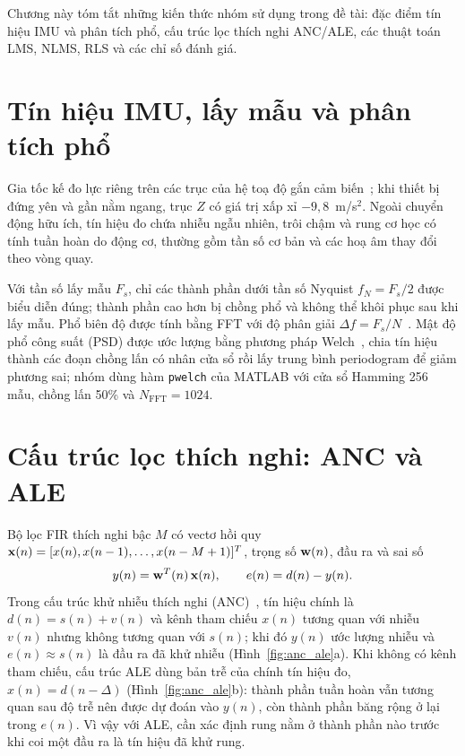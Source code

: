 \documentclass[../main.tex]{subfiles}
\begin{document}
Chương này tóm tắt những kiến thức nhóm sử dụng trong đề tài: đặc điểm tín hiệu IMU và phân tích phổ, cấu trúc lọc thích nghi ANC/ALE, các thuật toán LMS, NLMS, RLS và các chỉ số đánh giá.

\section{Tín hiệu IMU, lấy mẫu và phân tích phổ}

Gia tốc kế đo lực riêng trên các trục của hệ toạ độ gắn cảm biến~\cite{titterton2004strapdown}; khi thiết bị đứng yên và gần nằm ngang, trục $Z$ có giá trị xấp xỉ $-9{,}8$~m/s$^2$. Ngoài chuyển động hữu ích, tín hiệu đo chứa nhiễu ngẫu nhiên, trôi chậm và rung cơ học có tính tuần hoàn do động cơ, thường gồm tần số cơ bản và các hoạ âm thay đổi theo vòng quay.

Với tần số lấy mẫu $F_s$, chỉ các thành phần dưới tần số Nyquist $f_N=F_s/2$ được biểu diễn đúng; thành phần cao hơn bị chồng phổ và không thể khôi phục sau khi lấy mẫu. Phổ biên độ được tính bằng FFT với độ phân giải $\Delta f=F_s/N$~\cite{oppenheim2010dtsp}. Mật độ phổ công suất (PSD) được ước lượng bằng phương pháp Welch~\cite{welch1967psd}, chia tín hiệu thành các đoạn chồng lấn có nhân cửa sổ rồi lấy trung bình periodogram để giảm phương sai; nhóm dùng hàm \texttt{pwelch} của MATLAB với cửa sổ Hamming 256 mẫu, chồng lấn 50\% và $N_{\mathrm{FFT}}=1024$.

\section{Cấu trúc lọc thích nghi: ANC và ALE}

Bộ lọc FIR thích nghi bậc $M$ có vectơ hồi quy $\mathbf{x}(n)=[x(n), x(n-1), \dots, x(n-M+1)]^T$, trọng số $\mathbf{w}(n)$, đầu ra và sai số
\begin{equation}
y(n)=\mathbf{w}^T(n)\,\mathbf{x}(n),\qquad e(n)=d(n)-y(n).
\label{eq:fir}
\end{equation}
Trong cấu trúc khử nhiễu thích nghi (ANC)~\cite{widrow1975anc}, tín hiệu chính là $d(n)=s(n)+v(n)$ và kênh tham chiếu $x(n)$ tương quan với nhiễu $v(n)$ nhưng không tương quan với $s(n)$; khi đó $y(n)$ ước lượng nhiễu và $e(n)\approx s(n)$ là đầu ra đã khử nhiễu (Hình~\ref{fig:anc_ale}a). Khi không có kênh tham chiếu, cấu trúc ALE dùng bản trễ của chính tín hiệu đo, $x(n)=d(n-\Delta)$ (Hình~\ref{fig:anc_ale}b): thành phần tuần hoàn vẫn tương quan sau độ trễ nên được dự đoán vào $y(n)$, còn thành phần băng rộng ở lại trong $e(n)$. Vì vậy với ALE, cần xác định rung nằm ở thành phần nào trước khi coi một đầu ra là tín hiệu đã khử rung.
\end{document}
